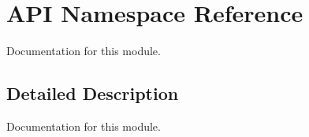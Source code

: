 \hypertarget{namespace_a_p_i}{}\section{A\+PI Namespace Reference}
\label{namespace_a_p_i}


Documentation for this module.  




\subsection{Detailed Description}
Documentation for this module. 